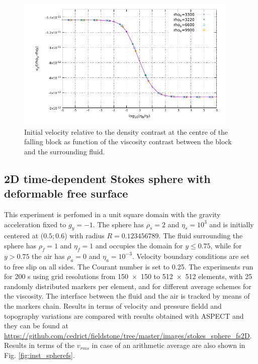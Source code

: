 \documentclass[hidelinks,11pt,a4paper]{article}
\begin{document}
\begin{figure}
\centering
\noindent\includegraphics[width=400px]{./Figures/Falling.pdf}
\caption{Initial velocity relative to the density contrast at the centre of the falling block as function of the viscosity contrast between the block and the surrounding fluid.}
\label{fig:falling}
\end{figure}

\subsection{2D time-dependent Stokes sphere with deformable free surface}\label{sec:sphere}
This experiment is perfomed in a unit square domain with the gravity acceleration fixed to $g_y=-1$. The sphere has $\rho_s=2$ and $\eta_s=10^3$ and is initially centered at ($0.5;0.6$) with radius $R=0.123456789$. The fluid surrounding the sphere has $\rho_f=1$ and $\eta_f=1$ and occupies the domain for $y\leq 0.75$, while for $y>0.75$ the air has $\rho_a=0$ and $\eta_a=10^{-3}$. Velocity boundary conditions are set to free slip on all sides. The Courant number is set to 0.25. The experiments run for 200 s using grid resolutions from \num{150x150} to \num{512x512} elements, with 25 randomly distributed markers per element, and for different average schemes for the viscosity. The interface between the fluid and the air is tracked by means of the markers chain. Results in terms of velocity and pressure fieldd and topography variations are compared with results obtained with ASPECT \citep{KHB12,heister_aspect_methods2,aspect-doi-v2.2.0,aspectmanual} and they can be found at \url{https://github.com/cedrict/fieldstone/tree/master/images/stokes_sphere_fs2D}. Results in terms of the $v_{rms}$ in case of an arithmetic average are also shown in Fig. \ref{fig:inst_spherefs}.
\end{document}
